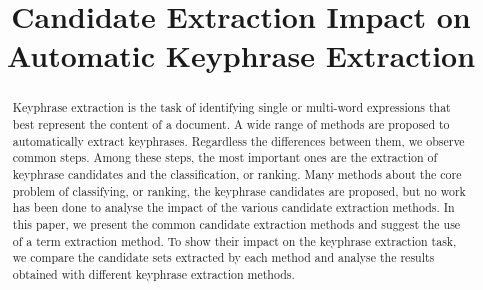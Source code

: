 \documentclass[11pt]{article}
\title{Candidate Extraction Impact on Automatic Keyphrase Extraction}
\date{}
\begin{document}
  \maketitle
  \begin{abstract}
    Keyphrase extraction is the task of identifying single or multi-word
    expressions that best represent the content of a document. A wide range of
    methods are proposed to automatically extract keyphrases. Regardless the
    differences between them, we observe common steps. Among these steps, the
    most important ones are the extraction of keyphrase candidates and the
    classification, or ranking. Many methods about the core problem of
    classifying, or ranking, the keyphrase candidates are proposed, but no work
    has been done to analyse the impact of the various candidate extraction
    methods. In this paper, we present the common candidate
    extraction methods and suggest the use of a term extraction method. To show
    their impact on the keyphrase extraction
    task, we compare the candidate sets extracted by each method and analyse the
    results obtained with different keyphrase extraction methods.
  \end{abstract}

  


  
  
\end{document}
